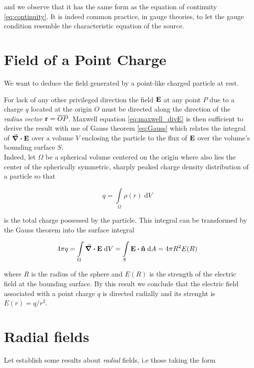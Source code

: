 and we observe that it has the same form as the equation of continuity \ref{eq:continuity}. It is indeed common practice, in gauge theories, to let the gauge condition resemble the characteristic equation of the source. 

\section{Field of a Point Charge} 
We want to deduce the field generated by a point-like charged particle at rest. 

For lack of any other privileged direction the field $\vb{E}$ at any point $P$ due to a charge $q$ located at the origin $O$ must be directed along the direction of the \textit{radius vector} $\vb{r} = \overline{OP}$. Maxwell equation \ref{eq:maxwell_divE} is then sufficient to derive the result with use of Gauss theorem \ref{eq:Gauss} which relates the integral of $\div{\vb{E}}$ over a volume $V$ enclosing the particle to the flux of $\vb{E}$ over the volume's bounding surface $S$. \\

Indeed, let $\Omega$ be a spherical volume centered on the origin where also lies the center of the spherically symmetric, sharply peaked charge density distribution of a particle so that 

\begin{equation}
q = \int\limits_{\Omega} \rho(r) \; \mathrm{d}V 
\end{equation}

is the total charge possessed by the particle. This integral can be transformed by the Gauss theorem into the surface integral 

\begin{equation}
4 \pi q = \int\limits_{\Omega}\div{\vb{E}} \; \mathrm{d}V = \int\limits_{S}\vb{E} \vdot \vu{n} \; \mathrm{d}A = 4 \pi R^2 E(R) \label{eq:pointcharge_flux}
\end{equation}

where $R$ is the radius of the sphere and $E(R)$ is the strength of the electric field at the bounding surface. By this result we conclude that the electric field associated with a point charge $q$ is directed radially and its strenght is
$E(r) = q/r^2$.



\section{Radial fields} 
Let establish some results about \textit{radial} fields, i.e those taking the form 

